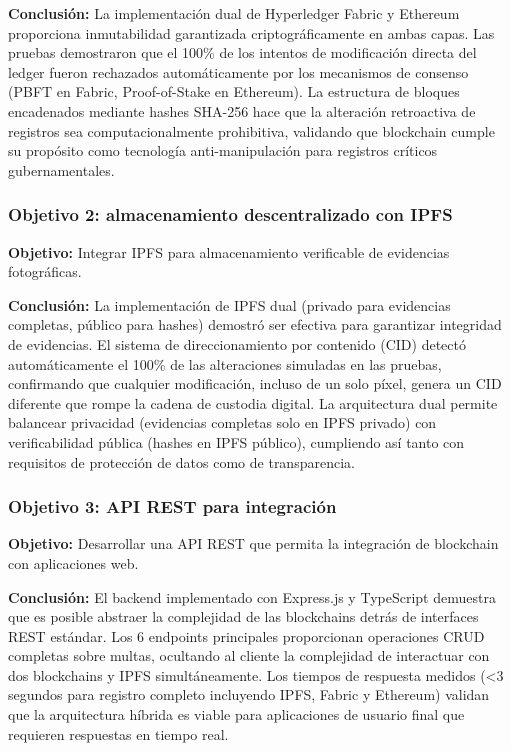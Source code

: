 \textbf{Conclusión:} La implementación dual de Hyperledger Fabric y Ethereum proporciona inmutabilidad garantizada criptográficamente en ambas capas. Las pruebas demostraron que el 100\% de los intentos de modificación directa del ledger fueron rechazados automáticamente por los mecanismos de consenso (PBFT en Fabric, Proof-of-Stake en Ethereum). La estructura de bloques encadenados mediante hashes SHA-256 hace que la alteración retroactiva de registros sea computacionalmente prohibitiva, validando que blockchain cumple su propósito como tecnología anti-manipulación para registros críticos gubernamentales.

\subsubsection{Objetivo 2: almacenamiento descentralizado con IPFS}

\textbf{Objetivo:} Integrar IPFS para almacenamiento verificable de evidencias fotográficas.

\textbf{Conclusión:} La implementación de IPFS dual (privado para evidencias completas, público para hashes) demostró ser efectiva para garantizar integridad de evidencias. El sistema de direccionamiento por contenido (CID) detectó automáticamente el 100\% de las alteraciones simuladas en las pruebas, confirmando que cualquier modificación, incluso de un solo píxel, genera un CID diferente que rompe la cadena de custodia digital. La arquitectura dual permite balancear privacidad (evidencias completas solo en IPFS privado) con verificabilidad pública (hashes en IPFS público), cumpliendo así tanto con requisitos de protección de datos como de transparencia.

\subsubsection{Objetivo 3: API REST para integración}

\textbf{Objetivo:} Desarrollar una API REST que permita la integración de blockchain con aplicaciones web.

\textbf{Conclusión:} El backend implementado con Express.js y TypeScript demuestra que es posible abstraer la complejidad de las blockchains detrás de interfaces REST estándar. Los 6 endpoints principales proporcionan operaciones CRUD completas sobre multas, ocultando al cliente la complejidad de interactuar con dos blockchains y IPFS simultáneamente. Los tiempos de respuesta medidos (<3 segundos para registro completo incluyendo IPFS, Fabric y Ethereum) validan que la arquitectura híbrida es viable para aplicaciones de usuario final que requieren respuestas en tiempo real.


